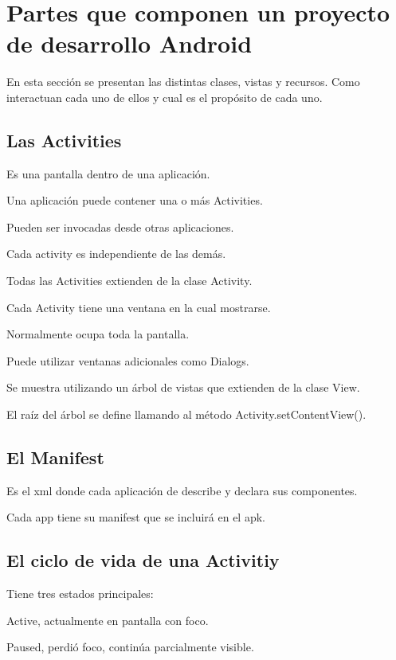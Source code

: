 \section{Partes que componen un proyecto de desarrollo Android}
\label{sec:dev.components}

En esta secci\'on se presentan las distintas clases, vistas y recursos. Como interactuan cada uno de ellos y cual es el prop\'osito de cada uno.

\subsection{Las Activities}
\label{subsec:dev.activities}

Es una pantalla dentro de una aplicaci\'on.

Una aplicaci\'on puede contener una o m\'as Activities.

Pueden ser invocadas desde otras aplicaciones.

Cada activity es independiente de las dem\'as.

Todas las Activities extienden de la clase Activity.

Cada Activity tiene una ventana en la cual mostrarse.

Normalmente ocupa toda la pantalla.

Puede utilizar ventanas adicionales como Dialogs.

Se muestra utilizando un \'arbol de vistas que extienden de la clase View.

El ra\'iz del \'arbol se define llamando al m\'etodo Activity.setContentView().

\subsection{El Manifest}
\label{subsec:dev.manifest}

Es el xml donde cada aplicación de describe y declara sus  componentes.

Cada app tiene su manifest que se incluirá en el apk.

\subsection{El ciclo de vida de una Activitiy}
\label{subsec:dev.activity.lifecycle}

Tiene tres estados principales:

Active, actualmente en pantalla con foco.

Paused, perdi\'o foco, contin\'ua parcialmente visible.

